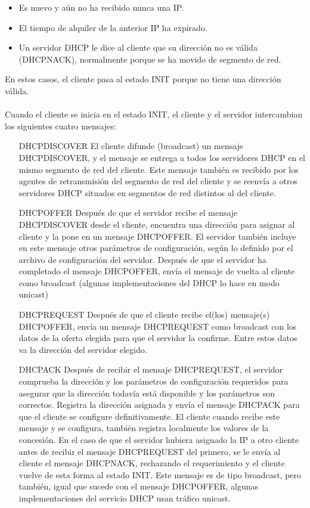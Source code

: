 	\begin{itemize}
		\item Es nuevo y aún no ha recibido nunca una IP.
		\item El tiempo de alquiler de la anterior IP ha expirado.
		\item Un servidor DHCP le dice al cliente que su dirección no es válida (DHCPNACK), normalmente porque se ha movido de segmento de red.
	\end{itemize}

En estos casos, el cliente pasa al estado INIT porque no tiene una dirección válida.\\\\

Cuando el cliente se inicia en el estado INIT, el cliente y el servidor intercambian los siguientes cuatro mensajes:
\begin{itemize}
	\item[\color{airforceblue}DHCPDISCOVER]  El cliente difunde (broadcast) un mensaje DHCPDISCOVER, y el mensaje se entrega a todos los servidores DHCP en el mismo segmento de red del cliente. Este mensaje también es recibido por los agentes de retransmisión del segmento de red del cliente y se reenvía a otros servidores DHCP situados en segmentos de red distintos al del cliente.
	\item[\color{airforceblue}DHCPOFFER] Después de que el servidor recibe el mensaje DHCPDISCOVER desde el cliente, encuentra una dirección para asignar al cliente y la pone en un mensaje DHCPOFFER. El servidor también incluye en este mensaje otros parámetros de configuración, según lo definido por el archivo de configuración del servidor. Después de que el servidor ha completado el mensaje DHCPOFFER, envía el mensaje de vuelta al cliente como broadcast (algunas implementaciones del DHCP lo hace en modo unicast)
	\item[\color{airforceblue}DHCPREQUEST]  Después de que el cliente recibe el(los) mensaje(s) DHCPOFFER, envía un mensaje DHCPREQUEST como broadcast con los datos de la oferta elegida para que el servidor la confirme. Entre estos datos va la dirección del servidor elegido.
	\item[\color{airforceblue}DHCPACK] Después de recibir el mensaje DHCPREQUEST, el servidor comprueba la dirección y los parámetros de configuración requeridos para asegurar que la dirección todavía está disponible y los parámetros son correctos. Registra la dirección asignada y envía el mensaje DHCPACK para que el cliente se configure definitivamente. El cliente cuando recibe este mensaje y se configura, también registra localmente los valores de la concesión. En el caso de que el servidor hubiera asignado la IP a otro cliente antes de recibir el mensaje DHCPREQUEST del primero, se le envía al cliente el mensaje DHCPNACK, rechazando el requerimiento y el cliente vuelve de esta forma al estado INIT. Este mensaje es de tipo broadcast, pero también, igual que sucede con el mensaje DHCPOFFER, algunas implementaciones del servicio DHCP usan tráfico unicast.
\end{itemize}

